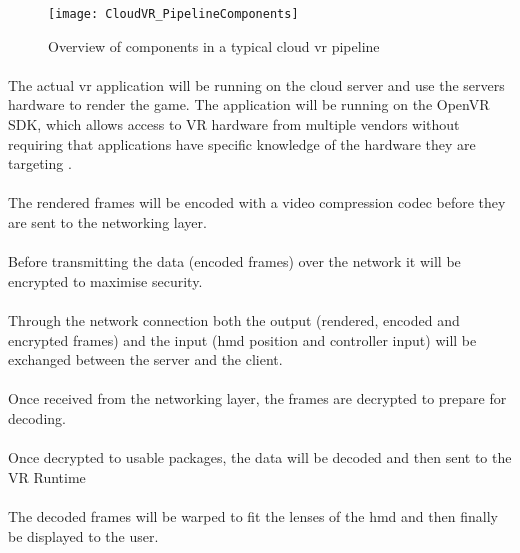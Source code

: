 \begin{figure}[h!]
\caption{Overview of components in a typical cloud \acrshort{vr} pipeline}
\label{fig:pipeline}
\texttt{[image: CloudVR\_PipelineComponents]}
\end{figure}

\paragraph{\textSR}
The actual \acrshort{vr} application will be running on the cloud server and use the servers hardware to render the game. The application will be running on the OpenVR SDK, which allows access to VR hardware from multiple vendors without requiring that applications have specific knowledge of the hardware they are targeting \parencite{openvrsdk}. 
\paragraph{\textSECO}
The rendered frames will be encoded with a video compression codec before they are sent to the networking layer.
\paragraph{\textSECR}
Before transmitting the data (encoded frames) over the network it will be encrypted to maximise security.
\paragraph{\textN}
Through the network connection both the output (rendered, encoded and encrypted frames) and the input (\acrshort{hmd} position and controller input) will be exchanged between the server and the client.
\paragraph{\textCDCR}
Once received from the networking layer, the frames are decrypted to prepare for decoding.
\paragraph{\textCDCO}
Once decrypted to usable packages, the data will be decoded and then sent to the VR Runtime
\paragraph{\textCRD}
The decoded frames will be warped to fit the lenses of the \acrshort{hmd} and then finally be displayed to the user.


